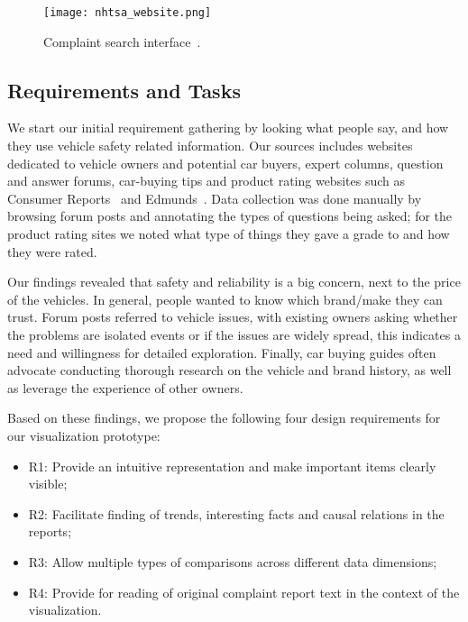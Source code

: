 	\begin{figure}
	   \centering  
	   \texttt{[image: nhtsa\_website.png]}
	   \caption{Complaint search interface~\cite{nhtsa}.}
	   \label{figure:nhtsa}
	\end{figure}



\subsection{Requirements and Tasks}

We start our initial requirement gathering by looking what people say, and
how they use vehicle safety related information. Our sources includes websites 
dedicated to vehicle owners and potential car buyers, expert columns, 
question and answer forums, car-buying tips and product rating websites such 
as Consumer Reports~\cite{consumerReports} and Edmunds~\cite{edmunds}. Data
collection was done manually by browsing forum posts and annotating the types of
questions being asked; for the product rating sites we noted what type of things
they gave a grade to and how they were rated.


Our findings revealed that safety and reliability is a big concern, next to the
price of the vehicles. In general, people wanted to know which brand/make 
they can trust. Forum posts referred to vehicle issues, with existing owners 
asking whether the problems are isolated events or if the issues are widely
spread, this indicates a need and willingness for detailed exploration. Finally, car buying 
guides often advocate conducting thorough research on the vehicle and brand history, 
as well as leverage the experience of other owners. 
 
Based on these findings, we propose the following four design requirements for
our visualization prototype:
\begin{itemize}[noitemsep]
  \item R1: Provide an intuitive representation and make important items clearly
  visible;
  \item R2: Facilitate finding of trends, interesting facts and causal relations
  in the reports;
  \item R3: Allow multiple types of comparisons across different data
  dimensions;
  \item R4: Provide for reading of original complaint report text in the context
  of the visualization.
\end{itemize}

